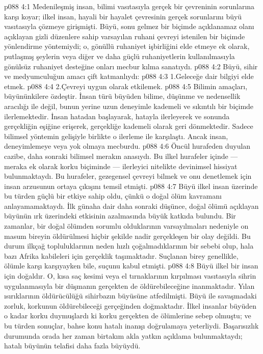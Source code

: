 \vs p088 4:1 Medenileşmiş insan, bilimi vasıtasıyla gerçek bir çevreninin sorunlarına karşı koyar; ilkel insan, hayali bir hayalet çevresinin gerçek sorunlarını büyü vasıtasıyla çözmeye girişmişti. Büyü, sonu gelmez bir biçimde açıklanamaz olanı açıklayan gizli düzenlere sahip varsayılan ruhani çevreyi istenilen bir biçimde yönlendirme yöntemiydi; o, gönüllü ruhaniyet işbirliğini elde etmeye ek olarak, putlaşmış şeylerin veya diğer ve daha güçlü ruhaniyetlerin kullanılmasıyla gönülsüz ruhaniyet desteğine onları mecbur kılma sanatıydı.
\vs p088 4:2 Büyü, sihir ve medyumculuğun amacı çift katmanlıydı:
\vs p088 4:3 1.\bibnobreakspace Geleceğe dair bilgiyi elde etmek.
\vs p088 4:4 2.\bibnobreakspace Çevreyi uygun olarak etkilemek.
\vs p088 4:5 Bilimin amaçları, büyününkilere özdeştir. İnsan türü büyüden bilime, düşünme ve nedensellik aracılığı ile değil, bunun yerine uzun deneyimle kademeli ve sıkıntılı bir biçimde ilerlemektedir. İnsan hatadan başlayarak, hatayla ilerleyerek ve sonunda gerçekliğin eşiğine erişerek, gerçekliğe kademeli olarak geri dönmektedir. Sadece bilimsel yöntemin gelişiyle birlikte o ilerleme ile karşılaştı. Ancak insan, deneyimlemeye veya yok olmaya mecburdu.
\vs p088 4:6 Öncül hurafeden duyulan cazibe, daha sonraki bilimsel merakın anasıydı. Bu ilkel hurafeler içinde --- meraka ek olarak korku biçiminde --- ilerleyici nitelikte devinimsel hissiyat bulunmaktaydı. Bu hurafeler, gezegensel çevreyi bilmek ve onu denetlemek için insan arzusunun ortaya çıkışını temsil etmişti.
\vs p088 4:7 Büyü ilkel insan üzerinde bu türden güçlü bir etkiye sahip oldu, çünkü o doğal ölüm kavramanı anlayamamaktaydı. İlk günaha dair daha sonraki düşünce, doğal ölümü açıklayan büyünün ırk üzerindeki etkisinin azalmasında büyük katkıda bulundu. Bir zamanlar, bir doğal ölümden sorumlu olduklarının varsayılmaları nedeniyle on masum bireyin öldürülmesi hiçbir şekilde nadir gerçekleşen bir olay değildi. Bu durum ilkçağ topluluklarının neden hızlı çoğalmadıklarının bir sebebi olup, hala bazı Afrika kabileleri için gerçeklik taşımaktadır. Suçlanan birey genellikle, ölümle karşı karşıyayken bile, suçunu kabul etmişti.
\vs p088 4:8 Büyü ilkel bir insan için doğaldır. O, kısa saç kesimi veya el tırnaklarının kırpılması vasıtasıyla sihrin uygulanmasıyla bir düşmanın gerçekten de öldürebileceğine inanmaktadır. Yılan ısırıklarının öldürücülüğü sihirbazın büyüsüne atfedilmişti. Büyü ile savaşmadaki zorluk, korkunun öldürebileceği gerçeğinden doğmaktadır. İlkel insanlar büyüden o kadar korku duymuşlardı ki korku gerçekten de ölümlerine sebep olmuştu; ve bu türden sonuçlar, bahse konu hatalı inanışı doğrulamaya yeterliydi. Başarısızlık durumunda orada her zaman birtakım akla yatkın açıklama bulunmaktaydı; hatalı büyünün telafisi daha fazla büyüydü.
